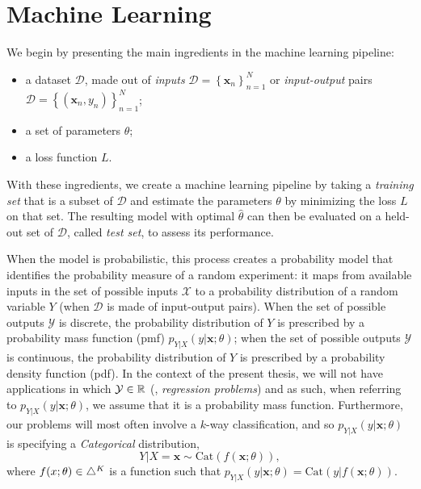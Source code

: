 \section{Machine Learning}
\label{sec:ml-primer}

\noindent We begin by presenting the main ingredients in the machine learning pipeline:
%
\begin{itemize}
    \item a dataset $\mathcal{D}$, made out of
          \textit{inputs} $\mathcal{D}=\left\{\bm{x}_n\right\}_{n=1}^N$ or
          \textit{input-output} pairs
          $\mathcal{D}=\left\{(\bm{x}_n,y_n)\right\}_{n=1}^N$;
    \item a set of parameters $\theta$;
    \item a loss function $L$.
\end{itemize}
%
With these ingredients, we create a machine learning pipeline by
taking a \textit{training set} that is a subset of $\mathcal{D}$ and estimate
the parameters $\theta$ by minimizing the loss
$L$ on that set. The resulting model with optimal
$\hat{\theta}$ can then be evaluated on a held-out set of
$\mathcal{D}$, called \textit{test set}, to assess its performance.

When the model is probabilistic, this process creates a probability
model that identifies the probability measure of a random experiment:
it maps from available inputs in the set of possible inputs
$\mathcal{X}$ to a probability distribution of a random variable $Y$
(when $\mathcal D$ is made of input-output pairs). When the set of
possible outputs $\mathcal{Y}$ is discrete, the probability
distribution of $Y$ is prescribed by a probability mass function
(pmf) $p_{Y|X}(y|\bm{x};\theta)$; when the set of possible outputs
$\mathcal{Y}$ is continuous, the probability distribution of $Y$ is
prescribed by a probability density function (pdf). In the context of
the present thesis, we will not have applications in which
$\mathcal{Y}\in\mathbb{R}$ (\ie, \textit{regression problems}) and as
such, when referring to $p_{Y|X}(y|\bm{x};\theta)$, we assume that it is a
probability mass function. Furthermore, our problems will most often
involve a $k$-way classification, and so $p_{Y|X}(y|\bm{x};\theta)$ is
specifying a \textit{Categorical} distribution,
%
\begin{equation}
    Y|X\!\!=\!\bm{x} \sim \text{Cat}(f(\bm{x}; \theta)),
\end{equation}
%
where $f(x; \theta) \in \triangle^K$ is a function such that
$p_{Y|X}(y|\bm{x};\theta)=\text{Cat}(y|f(\bm{x}; \theta))$.

